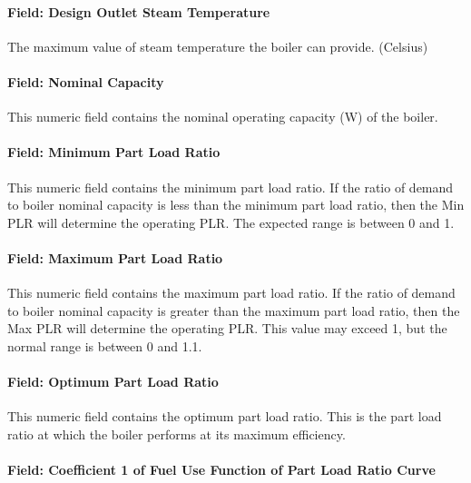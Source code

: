 \paragraph{Field: Design Outlet Steam Temperature}\label{field-design-outlet-steam-temperature}

The maximum value of steam temperature the boiler can provide. (Celsius)

\paragraph{Field: Nominal Capacity}\label{field-nominal-capacity-7}

This numeric field contains the nominal operating capacity (W) of the boiler.

\paragraph{Field: Minimum Part Load Ratio}\label{field-minimum-part-load-ratio-10}

This numeric field contains the minimum part load ratio. If the ratio of demand to boiler nominal capacity is less than the minimum part load ratio, then the Min PLR will determine the operating PLR. The expected range is between 0 and 1.

\paragraph{Field: Maximum Part Load Ratio}\label{field-maximum-part-load-ratio-10}

This numeric field contains the maximum part load ratio. If the ratio of demand to boiler nominal capacity is greater than the maximum part load ratio, then the Max PLR will determine the operating PLR. This value may exceed 1, but the normal range is between 0 and 1.1.

\paragraph{Field: Optimum Part Load Ratio}\label{field-optimum-part-load-ratio-10}

This numeric field contains the optimum part load ratio. This is the part load ratio at which the boiler performs at its maximum efficiency.

\paragraph{Field: Coefficient 1 of Fuel Use Function of Part Load Ratio Curve}\label{field-coefficient-1-of-fuel-use-function-of-part-load-ratio-curve}


